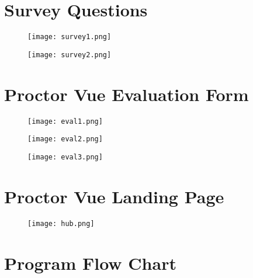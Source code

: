 \chapter{Survey Questions}

\begin{figure}[!ht]
  \begin{center}
    \texttt{[image: survey1.png]}
  \end{center}
\end{figure}

\begin{figure}[!ht]
  \begin{center}
    \texttt{[image: survey2.png]}
  \end{center}
\end{figure}

\chapter{Proctor Vue Evaluation Form}

\begin{figure}[!ht]
  \begin{center}
    \texttt{[image: eval1.png]}
  \end{center}
\end{figure}

\begin{figure}[!ht]
  \begin{center}
    \texttt{[image: eval2.png]}
  \end{center}
\end{figure}

\begin{figure}[!ht]
  \begin{center}
    \texttt{[image: eval3.png]}
  \end{center}
\end{figure}

\chapter{Proctor Vue Landing Page}

\begin{figure}[!ht]
  \begin{center}
    \texttt{[image: hub.png]}
  \end{center}
\end{figure}

\chapter{Program Flow Chart}

